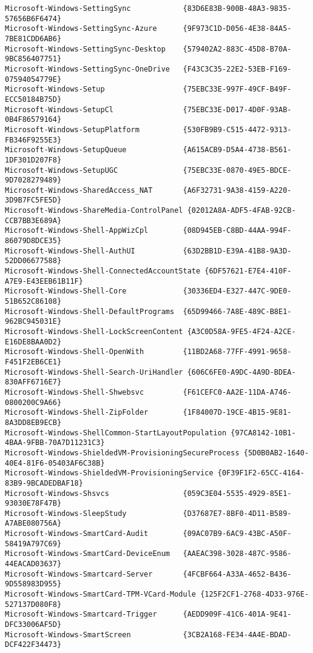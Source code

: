 \documentclass{report}
\begin{document}
\begin{lstlisting}[breaklines=true,basicstyle=\tiny]
Microsoft-Windows-SettingSync            {83D6E83B-900B-48A3-9835-57656B6F6474}
Microsoft-Windows-SettingSync-Azure      {9F973C1D-D056-4E38-84A5-7BE81CDD6AB6}
Microsoft-Windows-SettingSync-Desktop    {579402A2-883C-45D8-B70A-9BC856407751}
Microsoft-Windows-SettingSync-OneDrive   {F43C3C35-22E2-53EB-F169-07594054779E}
Microsoft-Windows-Setup                  {75EBC33E-997F-49CF-B49F-ECC50184B75D}
Microsoft-Windows-SetupCl                {75EBC33E-D017-4D0F-93AB-0B4F86579164}
Microsoft-Windows-SetupPlatform          {530FB9B9-C515-4472-9313-FB346F9255E3}
Microsoft-Windows-SetupQueue             {A615ACB9-D5A4-4738-B561-1DF301D207F8}
Microsoft-Windows-SetupUGC               {75EBC33E-0870-49E5-BDCE-9D7028279489}
Microsoft-Windows-SharedAccess_NAT       {A6F32731-9A38-4159-A220-3D9B7FC5FE5D}
Microsoft-Windows-ShareMedia-ControlPanel {02012A8A-ADF5-4FAB-92CB-CCB7BB3E689A}
Microsoft-Windows-Shell-AppWizCpl        {08D945EB-C8BD-44AA-994F-86079D8DCE35}
Microsoft-Windows-Shell-AuthUI           {63D2BB1D-E39A-41B8-9A3D-52DD06677588}
Microsoft-Windows-Shell-ConnectedAccountState {6DF57621-E7E4-410F-A7E9-E43EEB61B11F}
Microsoft-Windows-Shell-Core             {30336ED4-E327-447C-9DE0-51B652C86108}
Microsoft-Windows-Shell-DefaultPrograms  {65D99466-7A8E-489C-B8E1-962BC945031E}
Microsoft-Windows-Shell-LockScreenContent {A3C0D58A-9FE5-4F24-A2CE-E16DE8BAA0D2}
Microsoft-Windows-Shell-OpenWith         {11BD2A68-77FF-4991-9658-F451F2EB6CE1}
Microsoft-Windows-Shell-Search-UriHandler {606C6FE0-A9DC-4A9D-BDEA-830AFF6716E7}
Microsoft-Windows-Shell-Shwebsvc         {F61CEFC0-AA2E-11DA-A746-0800200C9A66}
Microsoft-Windows-Shell-ZipFolder        {1F84007D-19CE-4B15-9E81-8A3DD8EB9ECB}
Microsoft-Windows-ShellCommon-StartLayoutPopulation {97CA8142-10B1-4BAA-9FBB-70A7D11231C3}
Microsoft-Windows-ShieldedVM-ProvisioningSecureProcess {5D0B0AB2-1640-40E4-81F6-05403AF6C38B}
Microsoft-Windows-ShieldedVM-ProvisioningService {0F39F1F2-65CC-4164-83B9-9BCADEDBAF18}
Microsoft-Windows-Shsvcs                 {059C3E04-5535-4929-85E1-93030E78F47B}
Microsoft-Windows-SleepStudy             {D37687E7-8BF0-4D11-B589-A7ABE080756A}
Microsoft-Windows-SmartCard-Audit        {09AC07B9-6AC9-43BC-A50F-58419A797C69}
Microsoft-Windows-SmartCard-DeviceEnum   {AAEAC398-3028-487C-9586-44EACAD03637}
Microsoft-Windows-Smartcard-Server       {4FCBF664-A33A-4652-B436-9D558983D955}
Microsoft-Windows-SmartCard-TPM-VCard-Module {125F2CF1-2768-4D33-976E-527137D080F8}
Microsoft-Windows-Smartcard-Trigger      {AEDD909F-41C6-401A-9E41-DFC33006AF5D}
Microsoft-Windows-SmartScreen            {3CB2A168-FE34-4A4E-BDAD-DCF422F34473}

\end{lstlisting}
\end{document}
